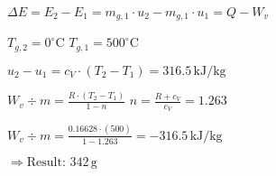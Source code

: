 \( \Delta E = E_2 - E_1 = m_{g,1} \cdot u_2 - m_{g,1} \cdot u_1 = Q - W_v \)  

\( T_{g,2} = 0^\circ \text{C} \)  
\( T_{g,1} = 500^\circ \text{C} \)  

\( u_2 - u_1 = c_V \cdot (T_2 - T_1) = 316.5 \, \text{kJ/kg} \)  

\( W_v \div m = \frac{R \cdot (T_2 - T_1)}{1 - n} \)  
\( n = \frac{R + c_V}{c_V} = 1.263 \)  

\( W_v \div m = \frac{0.16628 \cdot (500)}{1 - 1.263} = -316.5 \, \text{kJ/kg} \)  

\( \Rightarrow \text{Result: } 342 \, \text{g} \)